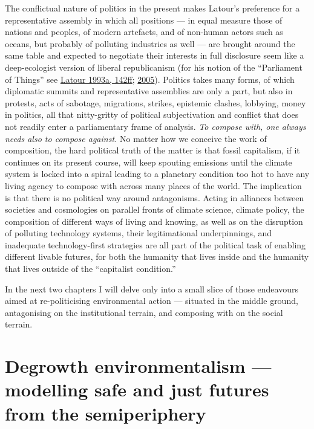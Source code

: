 \documentclass[a4paper, nobind]{templates/ociamthesis}
\begin{document}
The conflictual nature of politics in the present makes Latour's preference for a representative assembly in which all positions --- in equal measure those of nations and peoples, of modern artefacts, and of non-human actors such as oceans, but probably of polluting industries as well --- are brought around the same table and expected to negotiate their interests in full disclosure seem like a deep-ecologist version of liberal republicanism (for his notion of the {``Parliament of Things''} see \protect\hyperlink{ref-latour_we_1993}{Latour 1993a, 142ff}; \protect\hyperlink{ref-latour_realpolitik_2005}{2005}). Politics takes many forms, of which diplomatic summits and representative assemblies are only a part, but also in protests, acts of sabotage, migrations, strikes, epistemic clashes, lobbying, money in politics, all that nitty-gritty of political subjectivation and conflict that does not readily enter a parliamentary frame of analysis. \emph{To compose with, one always needs also to compose against.} No matter how we conceive the work of composition, the hard political truth of the matter is that fossil capitalism, if it continues on its present course, will keep spouting emissions until the climate system is locked into a spiral leading to a planetary condition too hot to have any living agency to compose with across many places of the world. The implication is that there is no political way around antagonisms. Acting in alliances between societies and cosmologies on parallel fronts of climate science, climate policy, the composition of different ways of living and knowing, as well as on the disruption of polluting technology systems, their legitimational underpinnings, and inadequate technology-first strategies are all part of the political task of enabling different livable futures, for both the humanity that lives inside and the humanity that lives outside of the ``capitalist condition.''

In the next two chapters I will delve only into a small slice of those endeavours aimed at re-politicising environmental action --- situated in the middle ground, antagonising on the institutional terrain, and composing with on the social terrain.

\hypertarget{degrowth-environmentalism-modelling-safe-and-just-futures-from-the-semiperiphery}{%
\chapter{Degrowth environmentalism --- modelling safe and just futures from the semiperiphery}\label{degrowth-environmentalism-modelling-safe-and-just-futures-from-the-semiperiphery}}
\end{document}
